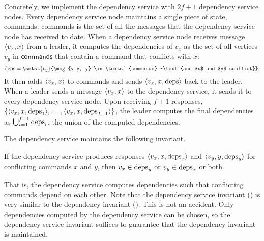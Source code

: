 Concretely, we implement the dependency service with $2f+1$ dependency service
nodes. Every dependency service node maintains a single piece of state,
\textsf{commands}. \textsf{commands} is the set of all the messages that the
dependency service node has received to date. When a dependency service node
receives message $\langle v_x, x \rangle$ from a leader, it computes the dependencies of
$v_x$ as the set of all vertices $v_y$ in $\textsf{commands}$ that contain a
command that conflicts with $x$:
\[
  \deps{} = \setst{v_y}{\msg{v_y, y} \in \textsf{commands}
                        ~\text{and $x$ and $y$ conflict}}.
\]
It then adds $\langle v_x, x \rangle$ to \textsf{commands} and sends $\langle v_x, x,
\text{deps} \rangle$ back to the leader. When a leader sends a message $\langle v_x, x \rangle$ to
the dependency service, it sends it to every dependency service node. Upon
receiving $f + 1$ responses, $\{\langle v_x, x, \text{deps}_1 \rangle, \ldots, \langle v_x,
x, \text{deps}_{f+1} \rangle\}$, the leader computes the final dependencies as
$\bigcup_{i=1}^{f+1} \text{deps}_i$, the union of the computed dependencies.

The dependency service maintains the following invariant.

\begin{invariant}%
  If the dependency service produces responses $\langle v_x, x, \text{deps}_x \rangle$ and
  $\langle v_y, y, \text{deps}_y \rangle$ for conflicting commands $x$ and $y$, then $v_x \in
  \text{deps}_y$ or $v_y \in \text{deps}_x$ or both.
\end{invariant}

That is, the dependency service computes dependencies such that conflicting
commands depend on each other. Note that the dependency service invariant
() is very similar to the dependency invariant
(). This is not an accident. Only dependencies computed by
the dependency service can be chosen, so the dependency service invariant
suffices to guarantee that the dependency invariant is maintained.

